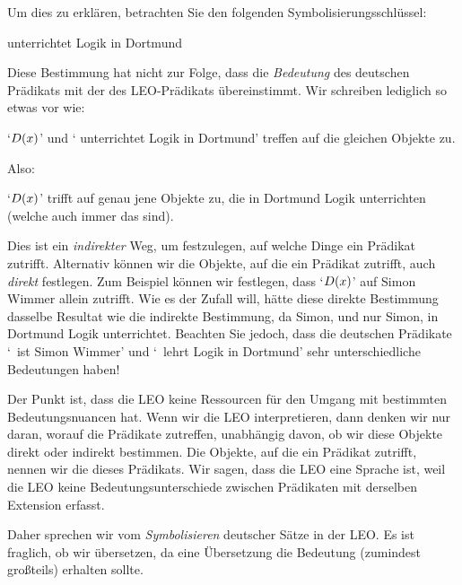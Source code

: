 Um dies zu erklären, betrachten Sie den folgenden Symbolisierungsschlüssel: 
	\begin{ekey}
		\item[\atom{D}{x}]  unterrichtet Logik in Dortmund
	\end{ekey} 
Diese Bestimmung hat nicht zur Folge, dass die \emph{Bedeutung} des deutschen Prädikats mit der des LEO-Prädikats übereinstimmt. Wir schreiben lediglich so etwas vor wie:
	\begin{ebullet}
		\item `$\mathord{D}(x)$' und ` unterrichtet Logik in Dortmund' treffen auf die gleichen Objekte zu. 
	\end{ebullet}
Also:
	\begin{ebullet}
		\item `$\mathord{D}(x)$' trifft auf genau jene Objekte zu, die in Dortmund Logik unterrichten (welche auch immer das sind).
	\end{ebullet}
Dies ist ein \emph{indirekter} Weg, um festzulegen, auf welche Dinge ein Prädikat zutrifft. Alternativ können wir die Objekte, auf die ein Prädikat zutrifft, auch \emph{direkt} festlegen. Zum Beispiel können wir festlegen, dass `$\mathord{D}(x)$' auf Simon Wimmer allein zutrifft. Wie es der Zufall will, hätte diese direkte Bestimmung dasselbe Resultat wie die indirekte Bestimmung, da Simon, und nur Simon, in Dortmund Logik unterrichtet. Beachten Sie jedoch, dass die deutschen Prädikate `\blank\ ist Simon Wimmer' und `\blank\ lehrt Logik in Dortmund' sehr unterschiedliche Bedeutungen haben!

Der Punkt ist, dass die LEO keine Ressourcen für den Umgang mit bestimmten Bedeutungsnuancen hat. Wenn wir die LEO interpretieren, dann denken wir nur daran, worauf die Prädikate zutreffen, unabhängig davon, ob wir diese Objekte direkt oder indirekt bestimmen. Die Objekte, auf die ein Prädikat zutrifft, nennen wir die  dieses Prädikats. Wir sagen, dass die LEO eine  Sprache ist, weil die LEO keine Bedeutungsunterschiede zwischen Prädikaten mit derselben Extension erfasst.    

Daher sprechen wir vom \emph{Symbolisieren} deutscher Sätze in der LEO. Es ist fraglich, ob wir übersetzen, da eine Übersetzung die Bedeutung (zumindest gro{\ss}teils) erhalten sollte. 


